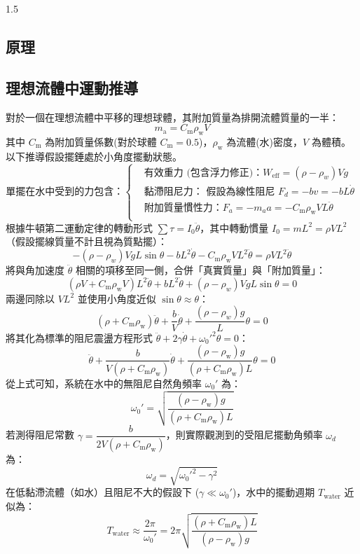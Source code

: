 \documentclass[10pt]{article}
\begin{document}
\begin{spacing}{1.5}
\begin{framed}
\section{原理}
\subsection{理想流體中運動推導}
\qquad 對於一個在理想流體中平移的理想球體，其附加質量為排開流體質量的一半：
$$m_\text{a} = C_\text{m} \rho_\text{w} V$$
其中 $C_\text{m}$ 為附加質量係數(對於球體 $C_\text{m} = 0.5$)，$\rho_\text{w}$ 為流體(水)密度，$V$ 為體積。以下推導假設擺錘處於小角度擺動狀態。
\[
\text{單擺在水中受到的力包含：}
\begin{cases}
 &\text{有效重力 (包含浮力修正)：} W_{\text{eff}} = (\rho - \rho_w)Vg \\
 &\text{黏滯阻尼力： 假設為線性阻尼 }F_d = -b v = -b L \dot{\theta}\\
 &\text{附加質量慣性力：} F_a = -m_a a = -C_\text{m} \rho_\text{w} V L \ddot{\theta}\\
\end{cases}
\]
根據牛頓第二運動定律的轉動形式 $\sum \tau = I_0 \ddot{\theta}$，其中轉動慣量 $I_0 = m L^2 = \rho V L^2$（假設擺線質量不計且視為質點擺）：
$$- (\rho - \rho_w) V g L \sin\theta - b L^2 \dot{\theta} - C_\text{m} \rho_\text{w} V L^2 \ddot{\theta} = \rho V L^2 \ddot{\theta}$$
將與角加速度 $\ddot{\theta}$ 相關的項移至同一側，合併「真實質量」與「附加質量」：
$$(\rho V + C_\text{m} \rho_\text{w} V) L^2 \ddot{\theta} + b L^2 \dot{\theta} + (\rho - \rho_w) V g L \sin\theta = 0$$
兩邊同除以 $V L^2$ 並使用小角度近似 $\sin\theta \approx \theta$：
$$(\rho + C_\text{m} \rho_\text{w}) \ddot{\theta} + \frac{b}{V} \dot{\theta} + \frac{(\rho - \rho_w)g}{L} \theta = 0$$
將其化為標準的阻尼震盪方程形式 $\ddot{\theta} + 2\gamma \dot{\theta} + \omega_0'^2 \theta = 0$：
$$\ddot{\theta} + \frac{b}{V(\rho + C_\text{m} \rho_\text{w})} \dot{\theta} + \frac{(\rho - \rho_\text{w})g}{(\rho + C_\text{m} \rho_\text{w})L} \theta = 0$$
從上式可知，系統在水中的無阻尼自然角頻率 $\omega_0'$ 為：
$$\omega_0' = \sqrt{ \frac{(\rho - \rho_\text{w})g}{(\rho + C_\text{m} \rho_\text{w})L} }$$
若測得阻尼常數 $\gamma = \dfrac{b}{2V(\rho + C_\text{m} \rho_\text{w})}$，則實際觀測到的受阻尼擺動角頻率 $\omega_d$ 為：
$$\omega_d = \sqrt{\omega_0'^2 - \gamma^2}$$
在低黏滯流體（如水）且阻尼不大的假設下 ($\gamma \ll \omega_0'$)，水中的擺動週期 $T_{\text{water}}$ 近似為：
$$T_{\text{water}} \approx \frac{2\pi}{\omega_0'} = 2\pi \sqrt{ \frac{(\rho + C_\text{m} \rho_\text{w})L}{(\rho - \rho_\text{w})g} }$$


\end{framed}
\end{spacing}
\end{document}
